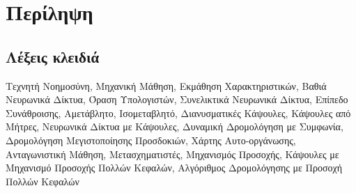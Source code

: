 \chapter*{Περίληψη}



\section*{Λέξεις κλειδιά}

\noindent
Τεχνητή Νοημοσύνη, Μηχανική Μάθηση, Εκμάθηση Χαρακτηριστικών, Βαθιά Νευρωνικά Δίκτυα, Όραση Υπολογιστών, Συνελικτικά Νευρωνικά Δίκτυα, Επίπεδο Συνάθροισης, Αμετάβλητο, Ισομεταβλητό, Διανυσματικές Κάψουλες, Κάψουλες από Μήτρες, Νευρωνικά Δίκτυα με Κάψουλες, Δυναμική Δρομολόγηση με Συμφωνία, Δρομολόγηση Μεγιστοποίησης Προσδοκιών, Χάρτης Αυτο-οργάνωσης, Ανταγωνιστική Μάθηση, Μετασχηματιστές, Μηχανισμός Προσοχής, Κάψουλες με Μηχανισμό Προσοχής Πολλών Κεφαλών, Αλγόριθμος Δρομολόγησης με Προσοχή Πολλών Κεφαλών
